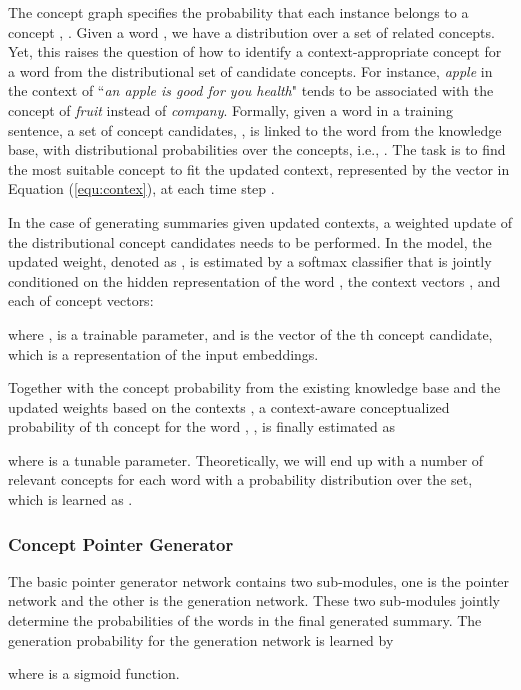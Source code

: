 \documentclass[11pt,a4paper]{article}
\begin{document}
The concept graph specifies the probability that each instance  belongs to a  concept , . Given a word , we have a distribution over a set of related concepts. Yet, this raises the question of how to identify a context-appropriate concept for a word from the distributional set of candidate concepts. For instance, {\em apple} in the context of ``{\em an apple is good for you health}" tends to be associated with the concept of {\em fruit} instead of {\em company}. Formally, given a  word  in a training sentence, a set of  concept candidates, , is linked to the word from the knowledge base, with distributional  probabilities over the concepts, i.e., . The task is to find the most suitable concept  to fit the updated context, represented by the  vector  in Equation (\ref{equ:contex}), at each time step . 

In the case of generating summaries given updated contexts,  a weighted update of the distributional concept candidates needs to be  performed. In the model, the updated weight, denoted as , is estimated by a softmax classifier that is jointly conditioned on the hidden representation of the word , the context vectors , and each of concept  vectors:

where ,   is a trainable parameter, and  is the vector of the  th concept candidate, which is a representation of the input embeddings. 

Together with the concept probability from the existing knowledge base  and the updated weights based on the contexts , a context-aware conceptualized probability of th concept for the word ,  ,  is finally estimated as 

where  is a tunable parameter.  
Theoretically,  
we will end up with a number of  relevant concepts for each word   with a probability distribution over the set, which is learned as .



\subsubsection{Concept Pointer Generator}
The basic pointer generator network contains two sub-modules, one is the pointer network and the other is the generation network. These two sub-modules jointly determine the probabilities of the words in the final generated summary. The generation probability   for the generation network \cite{DBLP:conf/acl/SeeLM17} is learned  by 

where  is a sigmoid function.  
\end{document}
